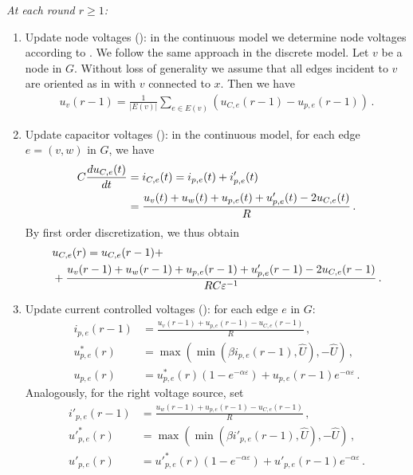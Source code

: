 \noindent
{\em At each round $r \ge 1$:}
\begin{enumerate}
\item Update node voltages (): in the continuous model we determine node voltages according to .
We follow the same approach in the discrete model.
Let $v$ be a node in $G$. Without loss of generality we assume that all edges incident to $v$ are oriented as in  with $v$ connected to $x$.
Then we have
\begin{align}
u_v(r-1) = \frac{1}{|E(v)|}\sum_{e \in E(v)}(u_{C,e}(r-1)-u_{p,e}(r-1))\,.\label{eq:dis:u}
\end{align}

\item Update capacitor voltages (): in the continuous model, for each edge $e=(v,w)$ in $G$, we have
\begin{align}
  C\frac{d u_{C,e}(t)}{dt} &= i_{C,e}(t) = i_{p,e}(t) + i'_{p,e}(t)\notag\\
  &= \frac{u_v(t)+u_w(t)+u_{p,e}(t)+u'_{p,e}(t)-2u_{C,e}(t)}{R}\,.
\end{align}
By first order discretization, we thus obtain
\begin{align}
  &u_{C,e}(r) = u_{C,e}(r-1) +\notag\\
  &+\frac{u_v(r-1)+u_w(r-1)+u_{p,e}(r-1)+u'_{p,e}(r-1)-2u_{C,e}(r-1)}{RC\varepsilon^{-1}}\,.\label{eq:dis:uC}
\end{align}

\item Update current controlled voltages (): for each edge $e$ in $G$:
\begin{align}
i_{p,e}(r-1) &= \frac{u_v(r-1)+u_{p,e}(r-1)-u_{C,e}(r-1)}{R}\,,\label{eq:left_up_18}\\  
u^*_{p,e}(r) &= \max(\min(\beta i_{p,e}(r-1),\hat{U}),-\hat{U})\,,\label{eq:left_up_19}\\
u_{p,e}(r)   &= u^*_{p,e}(r)(1-e^{-\alpha \varepsilon})+ u_{p,e}(r-1)e^{-\alpha \varepsilon}\,.\label{eq:left_up_20}
\end{align}
Analogously, for the right voltage source, set
\begin{align}
i'_{p,e}(r-1) &= \frac{u_w(r-1)+u_{p,e}(r-1)-u_{C,e}(r-1)}{R}\,,\label{eq:right_up_21}\\  
{u'}^*_{p,e}(r) &= \max(\min(\beta i'_{p,e}(r-1),\hat{U}),-\hat{U})\,,\label{eq:right_up_22}\\
u'_{p,e}(r)   &= {u'}^*_{p,e}(r)(1-e^{-\alpha \varepsilon})+ u'_{p,e}(r-1)e^{-\alpha \varepsilon}\,.\label{eq:right_up_23}
\end{align}

\end{enumerate}


